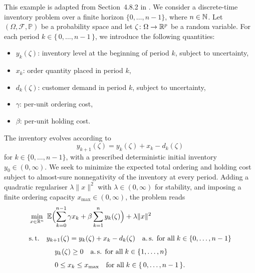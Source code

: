 This example is adapted from Section~4.8.2 in \cite{evans1983introduction}.
We consider a discrete-time inventory problem over a finite horizon
$\{0,\dots,n-1\}$, where $n\in\mathbb{N}$.
Let $(\Omega,\mathcal{F},\mathbb{P})$ be a probability space
and let $\zeta\colon\Omega\to\mathbb{R}^p$ be a random variable.
For each period $k\in\{\, 0,\dots,n-1 \,\}$,
we introduce the following quantities:
\begin{itemize}
    \item[-] $y_k(\zeta)$: inventory level at the beginning of period $k$, subject to uncertainty,
    \item[-] $x_k$: order quantity placed in period $k$,
    \item[-] $d_k(\zeta)$: customer demand in period $k$, subject to uncertainty,
    \item[-] $\gamma$: per-unit ordering cost,
    \item[-] $\beta$: per-unit holding cost.
\end{itemize}
The inventory evolves according to
\begin{equation}
    \label{eq:sec:numerical-example-inventory-control:dynamics}
    y_{k+1}(\zeta) = y_k(\zeta) + x_k - d_k(\zeta)
\end{equation}
for $k \in \{0,\dots,n-1\}$,
with a prescribed deterministic initial inventory $y_0 \in (0,\infty)$.
We seek to minimize the expected total ordering and holding cost subject
to almost-sure nonnegativity of the inventory at every period.
Adding a quadratic regulariser $\lambda\|x\|^2$ with $\lambda\in(0,\infty)$
for stability, and imposing a finite ordering capacity
$x_{\max}\in(0, \infty)$, the problem reads
\begin{equation}
    \label{eq:inventory-control-example}
    \begin{aligned}
        &\min_{x \in \mathbb{R}^{n}} \;
            \mathbb{E}\Bigl(\sum_{k=0}^{n-1} \gamma x_k
            + \beta \sum_{k=1}^{n} y_k(\zeta)\Bigr)
            + \lambda\|x\|^2 \\[6pt]
        &\text{s.\,t.}\quad
            y_{k+1}(\zeta) = y_k(\zeta) + x_k - d_k(\zeta)
            \quad\text{a.\,s. for all}
            \; k\in\{0,\dots,n-1\} \\[4pt]
        &\hspace{1.3cm}
            y_k(\zeta) \geq 0
            \quad\text{a.\,s. for all} \; k\in\{1,\dots,n\} \\[4pt]
        &\hspace{1.3cm}
            0 \leq x_k \leq x_{\max}
            \quad \text{for all} \; k \in \{\, 0,\dots,n-1 \,\}.
    \end{aligned}
\end{equation}
